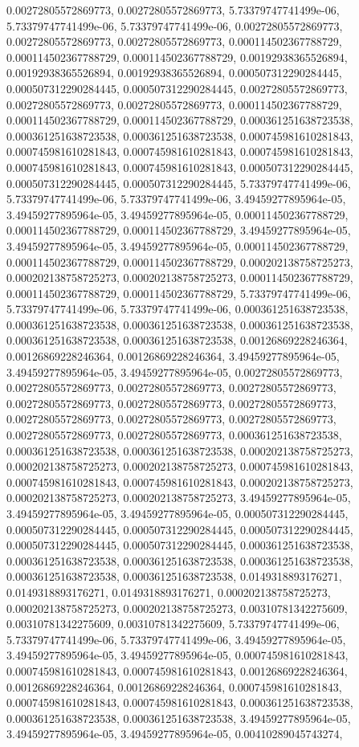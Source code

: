 \documentclass[
  ,man]{apa6}
\begin{document}
0.00272805572869773, 0.00272805572869773, 5.73379747741499e-06, 5.73379747741499e-06, 5.73379747741499e-06, 0.00272805572869773, 0.00272805572869773, 0.00272805572869773, 0.000114502367788729, 0.000114502367788729, 0.000114502367788729, 0.00192938365526894, 0.00192938365526894, 0.00192938365526894, 0.000507312290284445, 0.000507312290284445, 0.000507312290284445, 0.00272805572869773, 0.00272805572869773, 0.00272805572869773, 0.000114502367788729, 0.000114502367788729, 0.000114502367788729, 0.000361251638723538,
0.000361251638723538, 0.000361251638723538, 0.000745981610281843, 0.000745981610281843, 0.000745981610281843, 0.000745981610281843, 0.000745981610281843, 0.000745981610281843, 0.000507312290284445, 0.000507312290284445, 0.000507312290284445, 5.73379747741499e-06, 5.73379747741499e-06, 5.73379747741499e-06, 3.49459277895964e-05, 3.49459277895964e-05, 3.49459277895964e-05, 0.000114502367788729, 0.000114502367788729, 0.000114502367788729, 3.49459277895964e-05, 3.49459277895964e-05, 3.49459277895964e-05,
0.000114502367788729, 0.000114502367788729, 0.000114502367788729, 0.000202138758725273, 0.000202138758725273, 0.000202138758725273, 0.000114502367788729, 0.000114502367788729, 0.000114502367788729, 5.73379747741499e-06, 5.73379747741499e-06, 5.73379747741499e-06, 0.000361251638723538, 0.000361251638723538, 0.000361251638723538, 0.000361251638723538, 0.000361251638723538, 0.000361251638723538, 0.00126869228246364, 0.00126869228246364, 0.00126869228246364, 3.49459277895964e-05, 3.49459277895964e-05,
3.49459277895964e-05, 0.00272805572869773, 0.00272805572869773, 0.00272805572869773, 0.00272805572869773, 0.00272805572869773, 0.00272805572869773, 0.00272805572869773, 0.00272805572869773, 0.00272805572869773, 0.00272805572869773, 0.00272805572869773, 0.00272805572869773, 0.000361251638723538, 0.000361251638723538, 0.000361251638723538, 0.000202138758725273, 0.000202138758725273, 0.000202138758725273, 0.000745981610281843, 0.000745981610281843, 0.000745981610281843, 0.000202138758725273, 0.000202138758725273,
0.000202138758725273, 3.49459277895964e-05, 3.49459277895964e-05, 3.49459277895964e-05, 0.000507312290284445, 0.000507312290284445, 0.000507312290284445, 0.000507312290284445, 0.000507312290284445, 0.000507312290284445, 0.000361251638723538, 0.000361251638723538, 0.000361251638723538, 0.000361251638723538, 0.000361251638723538, 0.000361251638723538, 0.0149318893176271, 0.0149318893176271, 0.0149318893176271, 0.000202138758725273, 0.000202138758725273, 0.000202138758725273, 0.00310781342275609, 0.00310781342275609,
0.00310781342275609, 5.73379747741499e-06, 5.73379747741499e-06, 5.73379747741499e-06, 3.49459277895964e-05, 3.49459277895964e-05, 3.49459277895964e-05, 0.000745981610281843, 0.000745981610281843, 0.000745981610281843, 0.00126869228246364, 0.00126869228246364, 0.00126869228246364, 0.000745981610281843, 0.000745981610281843, 0.000745981610281843, 0.000361251638723538, 0.000361251638723538, 0.000361251638723538, 3.49459277895964e-05, 3.49459277895964e-05, 3.49459277895964e-05, 0.00410289045743274,
\end{document}

